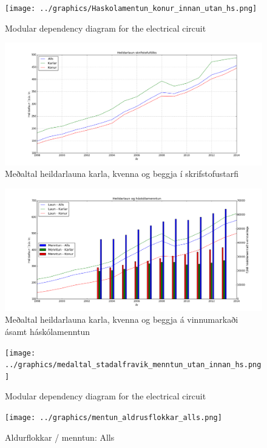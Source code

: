 \documentclass[12pt, git, draft]{rureport}
\begin{document}
\begin{figure}
	\centering 
	\texttt{[image: ../graphics/Haskolamentun\_konur\_innan\_utan\_hs.png]}
	\caption{Modular dependency diagram for the electrical circuit \label{fig:menntunkonur}}
\end{figure}

\begin{figure}
	\centering 
	\includegraphics[width=\textwidth]{graphics/heildar_laun.png}
	\caption{Meðaltal heildarlauna karla, kvenna og beggja í skrifstofustarfi \label{fig:heildarlaun}}
\end{figure}

\begin{figure}
	\centering 
	\includegraphics[width=\textwidth]{graphics/heildar_laun_og_haskolamentun.png}
	\caption{Meðaltal heildarlauna karla, kvenna og beggja á vinnumarkaði ásamt háskólamenntun \label{fig:heildarhask}}
\end{figure}

\begin{figure}
	\centering 
	\texttt{[image: ../graphics/medaltal\_stadalfravik\_menntun\_utan\_innan\_hs.png]}
	\caption{Modular dependency diagram for the electrical circuit \label{fig:stdhs}}
\end{figure}

\begin{figure}
	\centering 
	\texttt{[image: ../graphics/mentun\_aldrusflokkar\_alls.png]}
	\caption{Aldurflokkar / menntun: Alls \label{fig:menntunall}}
\end{figure}
\end{document}
